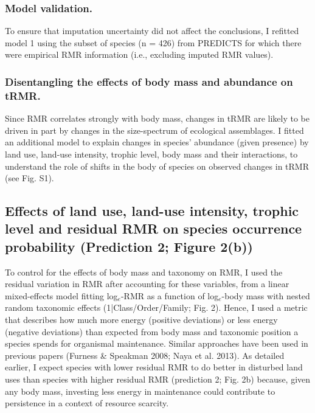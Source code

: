\subsubsection*{Model validation.}
To ensure that imputation uncertainty did not affect the conclusions, I refitted model 1 using the subset of species (n = 426) from PREDICTS for which there were empirical RMR information (i.e., excluding imputed RMR values). 

\subsubsection*{Disentangling the effects of body mass and abundance on tRMR.}
Since RMR correlates strongly with body mass, changes in tRMR are likely to be driven in part by changes in the size-spectrum of ecological assemblages. I fitted an additional model to explain changes in species’ abundance (given presence) by land use, land-use intensity, trophic level, body mass and their interactions, to understand the role of shifts in the body of species on observed changes in tRMR (see Fig. S1).  

\subsection{Effects of land use, land-use intensity, trophic level and residual RMR on species occurrence probability (Prediction 2; Figure 2(b))}

To control for the effects of body mass and taxonomy on RMR, I used the residual variation in RMR after accounting for these variables, from a linear mixed-effects model fitting log$_e$-RMR as a function of log$_e$-body mass with nested random taxonomic effects (1|Class/Order/Family; Fig. 2). Hence, I used a metric that describes how much more energy (positive deviations) or less energy (negative deviations) than expected from body mass and taxonomic position a species spends for organismal maintenance. Similar approaches have been used in previous papers (Furness \& Speakman 2008; Naya et al. 2013). As detailed earlier, I expect species with lower residual RMR to do better in disturbed land uses than species with higher residual RMR (prediction 2; Fig. 2b) because, given any body mass, investing less energy in maintenance could contribute to persistence in a context of resource scarcity. 

